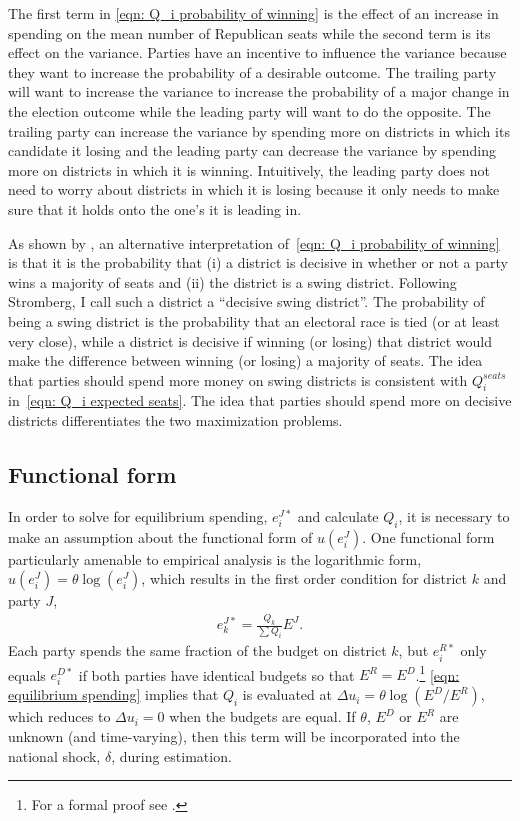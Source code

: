 \documentclass[12pt,final,fleqn]{article}
\theoremstyle{plain}
\begin{document}
The first term in \autoref{eqn: Q_i probability of winning} is the effect of an increase in spending on the mean number of Republican seats while the second term is its effect on the variance. Parties have an incentive to influence the variance because they want to increase the probability of a desirable outcome. The trailing party will want to increase the variance to increase the probability of a major change in the election outcome while the leading party will want to do the opposite. The trailing party can increase the variance by spending more on districts in which its candidate it losing and the leading party can decrease the variance by spending more on districts in which it is winning. Intuitively, the leading party does not need to worry about districts in which it is losing because it only needs to make sure that it holds onto the one's it is leading in.

As shown by \citet{stromberg2008electoral}, an alternative interpretation of~\autoref{eqn: Q_i probability of winning} is that it is the probability that (i) a district is decisive in whether or not a party wins a majority of seats and (ii) the district is a swing district. Following Stromberg, I call such a district a ``decisive swing district''. The probability of being a swing district is the probability that an electoral race is tied (or at least very close), while a district is decisive if winning (or losing) that district would make the difference between winning (or losing) a majority of seats. The idea that parties should spend more money on swing districts is consistent with $Q_i^{seats}$ in~\autoref{eqn: Q_i expected seats}. The idea that parties should spend more on decisive districts differentiates the two maximization problems.

\subsection{Functional form} \label{sec:functional-form}
In order to solve for equilibrium spending, $e_i^{J*}$ and calculate $Q_i$, it is necessary to make an assumption about the functional form of $u(e_i^J)$. One functional form particularly amenable to empirical analysis is the logarithmic form, $u(e_i^J)= \theta \log (e_i^J)$, which results in the first order condition for district $k$ and party $J$,
\begin{align} \label{eqn: equilibrium spending}
e_k^{J*} = \frac{Q_k}{\sum Q_i}E^{J}.
\end{align} 
Each party spends the same fraction of the budget on district $k$, but $e_i^{R*}$ only equals $e_i^{D*}$ if both parties have identical budgets so that $E^{R} = E^{D}$.\footnote{For a formal proof see \citet{stromberg2008electoral}.} \autoref{eqn: equilibrium spending} implies that $Q_i$ is evaluated at $\Delta u_i = \theta \log(E^D/E^R)$, which reduces to $\Delta u_i=0$ when the budgets are equal. If $\theta$, $E^D$ or $E^R$ are unknown (and time-varying), then this term will be incorporated into the national shock, $\delta$, during estimation.
\end{document}
